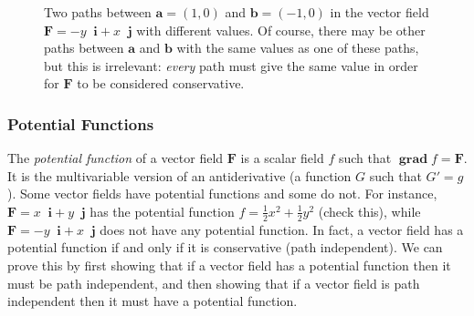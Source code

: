 \documentclass{myarticle}
\DeclareMathOperator{\grad}{\mathbf{grad}}
\renewcommand{\vec}[1]{\mathbf{#1}}
\newcommand{\unitvector}[1]{
  \mathop{}\!\vec{#1}
}
\newcommand{\ih}{\unitvector{i}}
\newcommand{\jh}{\unitvector{j}}
\theoremstyle{nospace}
\newtheorem{old series theorem}{Theorem}
\newenvironment{series theorem}
{\begin{mdframed}\begin{old series theorem}}
    {\end{old series theorem}\end{mdframed}}
\begin{document}
\begin{figure}[htb!] \centering
  \caption{Two paths between $\vec{a} = (1, 0)$ and
    $\vec{b} = (-1, 0)$ in the vector field $\vec{F} = -y \ih + x \jh$
    with different values. Of course, there may be other paths between
    $\vec{a}$ and $\vec{b}$ with the same values as one of these
    paths, but this is irrelevant: \textit{every} path must give the
    same value in order for $\vec{F}$ to be considered conservative.}
  \label{fig:path dependence}
\end{figure}

\subsubsection{Potential Functions}
\label{sec:potential functions}

The \textit{potential function} of a vector field $\vec{F}$ is a
scalar field $f$ such that $\grad f = \vec{F}$. It is the
multivariable version of an antiderivative (a function $G$ such that
$G' = g$). Some vector fields have potential functions and some do
not. For instance, $\vec{F} = x \ih + y \jh$ has the potential
function $f = \frac{1}{2}x^2 + \frac{1}{2}y^2$ (check this), while
$\vec{F} = -y \ih + x \jh$ does not have any potential function. In
fact, a vector field has a potential function if and only if it is
conservative (path independent). We can prove this by first showing
that if a vector field has a potential function then it must be path
independent, and then showing that if a vector field is path
independent then it must have a potential function.
\end{document}
